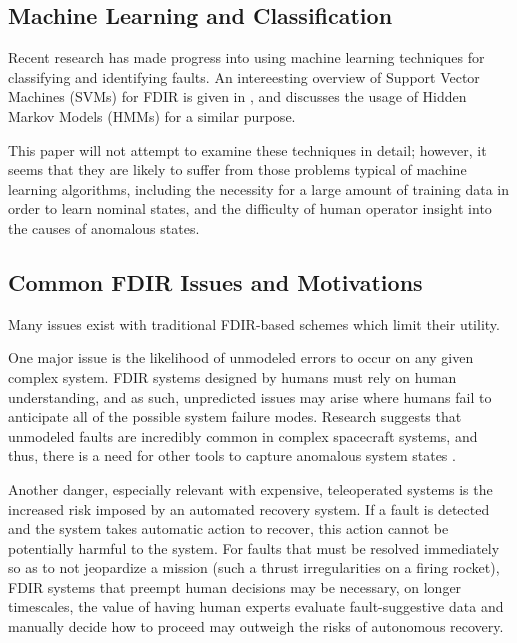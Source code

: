 \subsection{Machine Learning and Classification}

Recent research has made progress into using machine learning techniques for classifying and identifying faults. An intereesting overview of Support Vector Machines (SVMs) for FDIR is given in \cite{lin2006fault}, and \cite{aycard2000state} discusses the usage of Hidden Markov Models (HMMs) for a similar purpose.

This paper will not attempt to examine these techniques in detail; however, it seems that they are likely to suffer from those problems typical of machine learning algorithms, including the necessity for a large amount of training data in order to learn nominal states, and the difficulty of human operator insight into the causes of anomalous states.



\subsection{Common FDIR Issues and Motivations}

Many issues exist with traditional FDIR-based schemes which limit their utility.

One major issue is the likelihood of unmodeled errors to occur on any given complex system. FDIR systems designed by humans must rely on human understanding, and as such, unpredicted issues may arise where humans fail to anticipate all of the possible system failure modes. Research suggests that unmodeled faults are incredibly common in complex spacecraft systems, and thus, there is a need for other tools to capture anomalous system states \cite{kurien2010intrinsic}.

Another danger, especially relevant with expensive, teleoperated systems is the increased risk imposed by an automated recovery system. If a fault is detected and the system takes automatic action to recover, this action cannot be potentially harmful to the system. For faults that must be resolved immediately so as to not jeopardize a mission (such a thrust irregularities on a firing rocket), FDIR systems that preempt human decisions may be necessary, on longer timescales, the value of having human experts evaluate fault-suggestive data and manually decide how to proceed may outweigh the risks of autonomous recovery.

